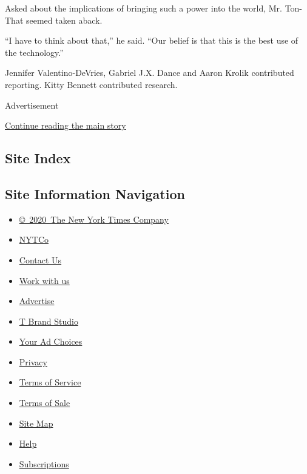 Asked about the implications of bringing such a power into the world,
Mr. Ton-That seemed taken aback.

``I have to think about that,'' he said. ``Our belief is that this is
the best use of the technology.''

Jennifer Valentino-DeVries, Gabriel J.X. Dance and Aaron Krolik
contributed reporting. Kitty Bennett contributed research.

Advertisement

\protect\hyperlink{after-bottom}{Continue reading the main story}

\hypertarget{site-index}{%
\subsection{Site Index}\label{site-index}}

\hypertarget{site-information-navigation}{%
\subsection{Site Information
Navigation}\label{site-information-navigation}}

\begin{itemize}
\tightlist
\item
  \href{https://help.nytimes.com/hc/en-us/articles/115014792127-Copyright-notice}{©~2020~The
  New York Times Company}
\end{itemize}

\begin{itemize}
\tightlist
\item
  \href{https://www.nytco.com/}{NYTCo}
\item
  \href{https://help.nytimes.com/hc/en-us/articles/115015385887-Contact-Us}{Contact
  Us}
\item
  \href{https://www.nytco.com/careers/}{Work with us}
\item
  \href{https://nytmediakit.com/}{Advertise}
\item
  \href{http://www.tbrandstudio.com/}{T Brand Studio}
\item
  \href{https://www.nytimes.com/privacy/cookie-policy\#how-do-i-manage-trackers}{Your
  Ad Choices}
\item
  \href{https://www.nytimes.com/privacy}{Privacy}
\item
  \href{https://help.nytimes.com/hc/en-us/articles/115014893428-Terms-of-service}{Terms
  of Service}
\item
  \href{https://help.nytimes.com/hc/en-us/articles/115014893968-Terms-of-sale}{Terms
  of Sale}
\item
  \href{https://spiderbites.nytimes.com}{Site Map}
\item
  \href{https://help.nytimes.com/hc/en-us}{Help}
\item
  \href{https://www.nytimes.com/subscription?campaignId=37WXW}{Subscriptions}
\end{itemize}
